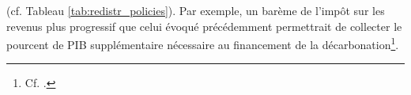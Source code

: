 \documentclass[a5paper,french,openany]{memoir}
\begin{document}
{%
} (cf. Tableau \ref{tab:redistr_policies}). 
Par exemple, un barème de l'impôt sur les revenus %
plus progressif que celui évoqué précédemment permettrait de collecter le pourcent de PIB supplémentaire nécessaire au financement de la décarbonation\footnote{Cf. \cite{aie_net_2021}.}. 
\end{document}
